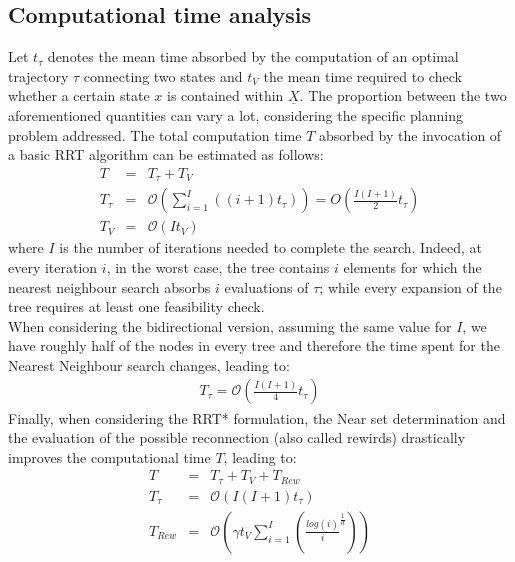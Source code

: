 \subsection{Computational time analysis} \label{Sec:cmpt_time_serial}

Let $t_{\tau}$ denotes the mean time absorbed by the computation of an optimal trajectory $\tau$ connecting two states and $t_{V}$ the mean time required to check whether a certain state $x$ is contained within $\underline{X}$. The proportion between the two aforementioned quantities can vary a lot, considering the specific planning problem addressed.  
The total computation time $T$ absorbed by the invocation of a basic RRT algorithm can be estimated as follows:
\begin{eqnarray}
T &=& T_{\tau} + T_V \nonumber\\
T_{\tau} & = & \mathcal{O} \left( \sum_{i=1}^I ((i+1)t_{\tau}) \right) = O \left( \frac{I(I+1)}{2} t_{\tau} \right) \nonumber\\
T_{V} & = & \mathcal{O} \left( I t_V \right) 
\label{eq:T_serial_single}
\end{eqnarray}
where $I$ is the number of iterations needed to complete the search. 
Indeed, at every iteration $i$, in the worst case, the tree contains $i$ elements for which the nearest neighbour search absorbs $i$ evaluations of $\tau$; while every expansion of the tree requires at least one feasibility check. 
\\
When considering the bidirectional version, assuming the same value for $I$, we have roughly half of the nodes in every tree and therefore the time spent for the Nearest Neighbour search changes, leading to:
\begin{eqnarray}
T_{\tau} = \mathcal{O} \left( \frac{I(I+1)}{4} t_{\tau} \right)
\label{eq:T_serial_bid}
\end{eqnarray}
Finally, when considering the RRT* formulation, the Near set determination and the evaluation of the possible reconnection (also called rewirds) drastically improves the computational time $T$, leading to:
\begin{eqnarray}
T &=& T_{\tau} + T_V \nonumber + T_{Rew}\\
T_{\tau} &= & \mathcal{O} \left(  I(I+1) t_{\tau} \right) \nonumber\\ 
T_{Rew} &= & \mathcal{O} \left( \gamma t_V \sum_{i=1}^I \left( \frac{log(i)}{i}^{\frac{1}{d}} \right)  \right)
  \label{eq:T_serial_star}
\end{eqnarray}

